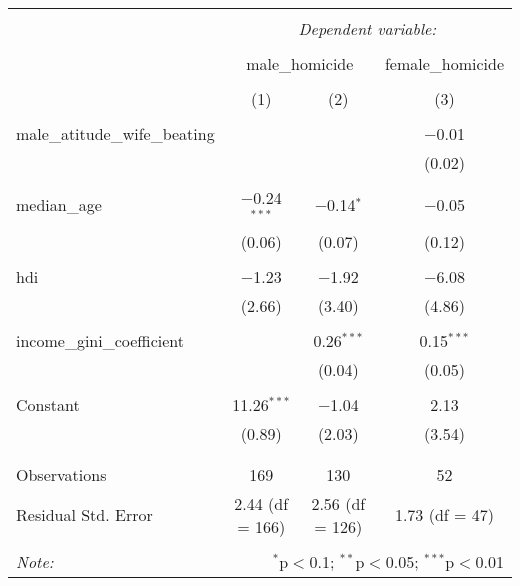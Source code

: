 
\begin{table}[!htbp] \centering 
  \caption{} 
  \label{} 
\begin{tabular}{@{\extracolsep{5pt}}lccc} 
\\[-1.8ex]\hline 
\hline \\[-1.8ex] 
 & \multicolumn{3}{c}{\textit{Dependent variable:}} \\ 
\cline{2-4} 
\\[-1.8ex] & \multicolumn{2}{c}{male\_homicide} & female\_homicide \\ 
\\[-1.8ex] & (1) & (2) & (3)\\ 
\hline \\[-1.8ex] 
 male\_atitude\_wife\_beating &  &  & $-$0.01 \\ 
  &  &  & (0.02) \\ 
  & & & \\ 
 median\_age & $-$0.24$^{***}$ & $-$0.14$^{*}$ & $-$0.05 \\ 
  & (0.06) & (0.07) & (0.12) \\ 
  & & & \\ 
 hdi & $-$1.23 & $-$1.92 & $-$6.08 \\ 
  & (2.66) & (3.40) & (4.86) \\ 
  & & & \\ 
 income\_gini\_coefficient &  & 0.26$^{***}$ & 0.15$^{***}$ \\ 
  &  & (0.04) & (0.05) \\ 
  & & & \\ 
 Constant & 11.26$^{***}$ & $-$1.04 & 2.13 \\ 
  & (0.89) & (2.03) & (3.54) \\ 
  & & & \\ 
\hline \\[-1.8ex] 
Observations & 169 & 130 & 52 \\ 
Residual Std. Error & 2.44 (df = 166) & 2.56 (df = 126) & 1.73 (df = 47) \\ 
\hline 
\hline \\[-1.8ex] 
\textit{Note:}  & \multicolumn{3}{r}{$^{*}$p$<$0.1; $^{**}$p$<$0.05; $^{***}$p$<$0.01} \\ 
\end{tabular} 
\end{table} 
